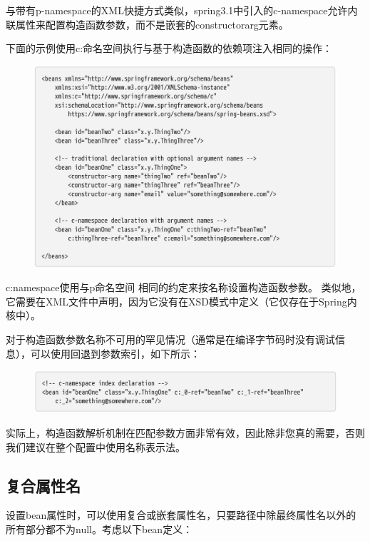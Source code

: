 与带有p-namespace的XML快捷方式类似，spring3.1中引入的c-namespace允许内联属性来配置构造函数参数，而不是嵌套的constructorarg元素。

下面的示例使用c:命名空间执行与基于构造函数的依赖项注入相同的操作：

\begin{figure}[ht]
    \centering
    \includegraphics[width=1\linewidth]{./Figure/IMG_code_52.png}
\end{figure}

c:namespace使用与p命名空间
相同的约定来按名称设置构造函数参数。
类似地，它需要在XML文件中声明，因为它没有在XSD模式中定义（它仅存在于Spring内核中）。


对于构造函数参数名称不可用的罕见情况（通常是在编译字节码时没有调试信息），可以使用回退到参数索引，如下所示：

\begin{figure}[ht]
    \centering
    \includegraphics[width=1\linewidth]{./Figure/IMG_code_53.png}
\end{figure}

实际上，构造函数解析机制在匹配参数方面非常有效，因此除非您真的需要，否则我们建议在整个配置中使用名称表示法。

\subsection{复合属性名}
设置bean属性时，可以使用复合或嵌套属性名，只要路径中除最终属性名以外的所有部分都不为null。考虑以下bean定义：

